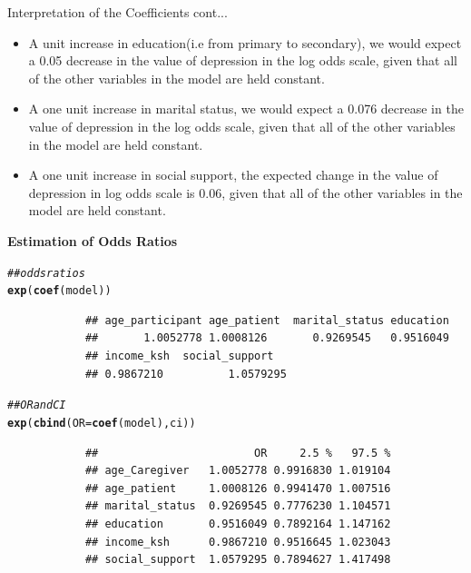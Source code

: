 \documentclass{beamer}
\makeatletter
\newcommand{\hlcom}[1]{\textcolor[rgb]{0.678,0.584,0.686}{\textit{#1}}}%
\newcommand{\hlstd}[1]{\textcolor[rgb]{0.345,0.345,0.345}{#1}}%
\newcommand{\hlkwc}[1]{\textcolor[rgb]{0.333,0.667,0.333}{#1}}%
\newcommand{\hlkwd}[1]{\textcolor[rgb]{0.737,0.353,0.396}{\textbf{#1}}}%
\newenvironment{kframe}{%
	\def\at@end@of@kframe{}%
	\ifinner\ifhmode%
	\def\at@end@of@kframe{\end{minipage}}%
\begin{minipage}{\columnwidth}%
	\fi\fi%
	\def\FrameCommand##1{\hskip\@totalleftmargin \hskip-\fboxsep
		\colorbox{shadecolor}{##1}\hskip-\fboxsep
		\hskip-\linewidth \hskip-\@totalleftmargin \hskip\columnwidth}%
	\MakeFramed {\advance\hsize-\width
		\@totalleftmargin\z@ \linewidth\hsize
		\@setminipage}}%
{\par\unskip\endMakeFramed%
	\at@end@of@kframe}
\newenvironment{knitrout}{}{} %
\numberwithin{equation}{section}
\numberwithin{table}{section}
\makeatother
\begin{document}
\begin{frame}{Interpretation of the Coefficients cont...}
\begin{itemize}
	\item 	A unit increase in education(i.e from primary to secondary), we would expect a 0.05 decrease in the value of depression in the log odds scale, given that all of the other variables in the model are held constant.
	
	\item A one unit increase in marital status, we would expect a 0.076 decrease in the value of depression in the log odds scale, given that all of the other variables in the model are held constant.
	
	\item A one unit increase in social support, the expected change in the value of depression in log odds scale is 0.06, given that all of the other variables in the model are held constant.
\end{itemize}
\end{frame}
\textbf{Estimation of Odds Ratios}
\begin{knitrout}
	\color{fgcolor}\begin{kframe}
		\begin{alltt}
			\hlcom{## odds ratios}
			\hlkwd{exp}\hlstd{(}\hlkwd{coef}\hlstd{(model))}
		\end{alltt}
		\begin{verbatim}
			## age_participant age_patient  marital_status education   
			##       1.0052778 1.0008126       0.9269545   0.9516049   
			## income_ksh  social_support 
			## 0.9867210          1.0579295
		\end{verbatim}
		\begin{alltt}
			\hlcom{## OR and CI}
			\hlkwd{exp}\hlstd{(}\hlkwd{cbind}\hlstd{(}\hlkwc{OR} \hlstd{=} \hlkwd{coef}\hlstd{(model), ci))}
		\end{alltt}
		\begin{verbatim}
			##                        OR     2.5 %   97.5 %
			## age_Caregiver   1.0052778 0.9916830 1.019104
			## age_patient     1.0008126 0.9941470 1.007516
			## marital_status  0.9269545 0.7776230 1.104571
			## education       0.9516049 0.7892164 1.147162
			## income_ksh      0.9867210 0.9516645 1.023043
			## social_support  1.0579295 0.7894627 1.417498
		\end{verbatim}
	\end{kframe}
\end{knitrout}
\end{document}
